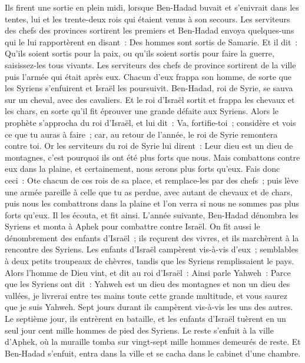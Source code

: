 \begin{multicols}{2}
Ils firent une sortie en plein midi, lorsque Ben-Hadad buvait et s'enivrait dans les tentes, lui et les trente-deux rois qui étaient venus à son secours.
Les serviteurs des chefs des provinces sortirent les premiers et Ben-Hadad envoya quelques-uns qui le lui rapportèrent en disant~: Des hommes sont sortis de Samarie.
Et il dit~: Qu'ils soient sortis pour la paix, ou qu'ils soient sortis pour faire la guerre, saisissez-les tous vivants.
Les serviteurs des chefs de province sortirent de la ville puis l'armée qui était après eux.
Chacun d'eux frappa son homme, de sorte que les Syriens s'enfuirent et Israël les poursuivit. Ben-Hadad, roi de Syrie, se sauva sur un cheval, avec des cavaliers.
Et le roi d'Israël sortit et frappa les chevaux et les chars, en sorte qu'il fit éprouver une grande défaite aux Syriens.
Alors le prophète s'approcha du roi d'Israël, et lui dit~: Va, fortifie-toi~; considère et vois ce que tu auras à faire~; car, au retour de l'année, le roi de Syrie remontera contre toi.
Or les serviteurs du roi de Syrie lui dirent~: Leur dieu est un dieu de montagnes, c'est pourquoi ils ont été plus forts que nous. Mais combattons contre eux dans la plaine, et certainement, nous serons plus forts qu'eux.
Fais donc ceci~: Ote chacun de ces rois de sa place, et remplace-les par des chefs~;
puis lève une armée pareille à celle que tu as perdue, avec autant de chevaux et de chars, puis nous les combattrons dans la plaine et l'on verra si nous ne sommes pas plus forts qu'eux. Il les écouta, et fit ainsi.
L'année suivante, Ben-Hadad dénombra les Syriens et monta à Aphek pour combattre contre Israël.
On fit aussi le dénombrement des enfants d'Israël~; ils reçurent des vivres, et ils marchèrent à la rencontre des Syriens. Les enfants d'Israël campèrent vis-à-vis d'eux~; semblables à deux petits troupeaux de chèvres, tandis que les Syriens remplissaient le pays.
Alors l'homme de Dieu vint, et dit au roi d'Israël~: Ainsi parle Yahweh~: Parce que les Syriens ont dit~: Yahweh est un dieu des montagnes et non un dieu des vallées, je livrerai entre tes mains toute cette grande multitude, et vous saurez que je suis Yahweh.
Sept jours durant ils campèrent vis-à-vis les uns des autres. Le septième jour, ils entrèrent en bataille, et les enfants d'Israël tuèrent en un seul jour cent mille hommes de pied des Syriens.
Le reste s'enfuit à la ville d'Aphek, où la muraille tomba sur vingt-sept mille hommes demeurés de reste. Et Ben-Hadad s'enfuit, entra dans la ville et se cacha dans le cabinet d'une chambre.

\end{multicols}

